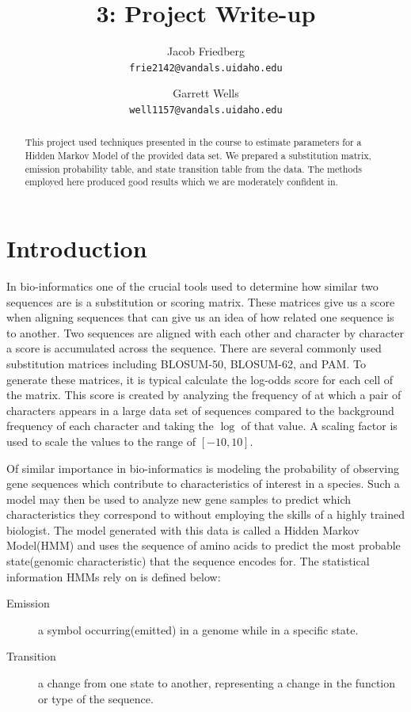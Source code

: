 \documentclass[a4paper,11pt]{article}
\title{3: Project Write-up}
\author{
Jacob Friedberg \\
\texttt{frie2142@vandals.uidaho.edu}
\and
Garrett Wells \\
\texttt{well1157@vandals.uidaho.edu}
}
\begin{document}
\maketitle
\begin{abstract}
    \noindent This project used techniques presented in the course to estimate parameters for a Hidden Markov Model of the provided data set. We prepared a substitution matrix, emission probability table, and state transition table from the data. The methods employed here produced good results which we are moderately confident in.
\end{abstract}

\section{Introduction}

In bio-informatics one of the crucial tools used to determine how similar two sequences are is a substitution or scoring matrix. These matrices give us a score when aligning sequences that can give us an idea of how related one sequence is to another. Two sequences are aligned with each other and character by character a score is accumulated across the sequence. There are several commonly used substitution matrices including BLOSUM-50, BLOSUM-62, and PAM. To generate these matrices, it is typical calculate the log-odds score for each cell of the matrix. This score is created by analyzing  the frequency of at which a pair of characters appears in a large data set of sequences compared to the background frequency of each character and taking the $\log$ of that value. A scaling factor is used to scale the values to the range of $[-10,10]$. 


Of similar importance in bio-informatics is modeling the probability of observing gene sequences which contribute to characteristics of interest in a species. Such a model may then be used to analyze new gene samples to predict which characteristics they correspond to without employing the skills of a highly trained biologist. The model generated with this data is called a Hidden Markov Model(HMM) and uses the sequence of amino acids to predict the most probable state(genomic characteristic) that the sequence encodes for. The statistical information HMMs rely on is defined below:

\begin{description}
    \item[Emission] a symbol occurring(emitted) in a genome while in a specific state.
    \item[Transition] a change from one state to another, representing a change in the function or type of the sequence.
\end{description}
\end{document}
